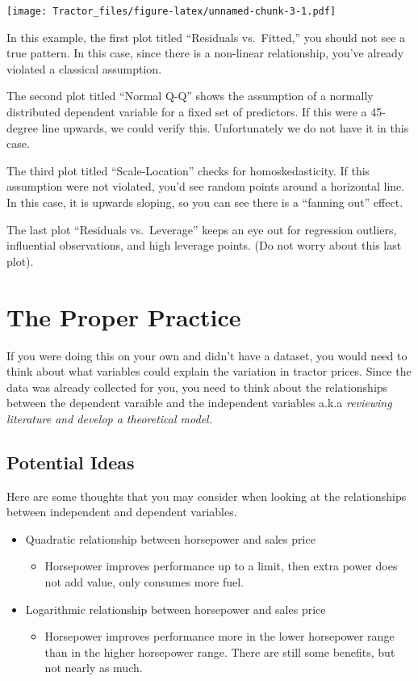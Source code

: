 \documentclass[
]{article}
\providecommand{\tightlist}{%
  \setlength{\itemsep}{0pt}\setlength{\parskip}{0pt}}
\begin{document}
\texttt{[image: Tractor\_files/figure-latex/unnamed-chunk-3-1.pdf]}

In this example, the first plot titled ``Residuals vs.~Fitted,'' you
should not see a true pattern. In this case, since there is a non-linear
relationship, you've already violated a classical assumption.

The second plot titled ``Normal Q-Q'' shows the assumption of a normally
distributed dependent variable for a fixed set of predictors. If this
were a 45-degree line upwards, we could verify this. Unfortunately we do
not have it in this case.

The third plot titled ``Scale-Location'' checks for homoskedasticity. If
this assumption were not violated, you'd see random points around a
horizontal line. In this case, it is upwards sloping, so you can see
there is a ``fanning out'' effect.

The last plot ``Residuals vs.~Leverage'' keeps an eye out for regression
outliers, influential observations, and high leverage points. (Do not
worry about this last plot).

\section{The Proper Practice}\label{the-proper-practice}

If you were doing this on your own and didn't have a dataset, you would
need to think about what variables could explain the variation in
tractor prices. Since the data was already collected for you, you need
to think about the relationships between the dependent varaible and the
independent variables a.k.a \emph{reviewing literature and develop a
theoretical model.}

\subsection{Potential Ideas}\label{potential-ideas}

Here are some thoughts that you may consider when looking at the
relationships between independent and dependent variables.

\begin{itemize}
\tightlist
\item
  Quadratic relationship between horsepower and sales price

  \begin{itemize}
  \tightlist
  \item
    Horsepower improves performance up to a limit, then extra power does
    not add value, only consumes more fuel.
  \end{itemize}
\item
  Logarithmic relationship between horsepower and sales price

  \begin{itemize}
  \tightlist
  \item
    Horsepower improves performance more in the lower horsepower range
    than in the higher horsepower range. There are still some benefits,
    but not nearly as much.
  \end{itemize}
\end{itemize}
\end{document}
